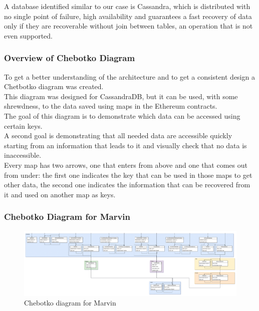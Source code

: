 \documentclass[ManualeSviluppatore.tex]{subfiles}
\begin{document}
A database identified similar to our case is Cassandra, which is distributed with no single point of failure, high availability and guarantees a fast recovery of data only if they are recoverable without join between tables, an operation that is not even supported.\\

\subsubsection{Overview of Chebotko Diagram}
To get a better understanding of the architecture and to get a consistent design a Chetbotko diagram was created.\\
This diagram was designed for CassandraDB, but it can be used, with some shrewdness, to the data saved using maps in the Ethereum contracts.\\
The goal of this diagram is to demonstrate which data can be accessed using certain keys.\\
A second goal is demonstrating that all needed data are accessible quickly starting from an information that leads to it and visually check that no data is inaccessible.\\
Every map has two arrows, one that enters from above and one that comes out from under: the first one indicates the key that can be used in those maps to get other data, the second one indicates the information that can be recovered from it and used on another map as keys.\\

\begin{landscape}
\newpage
\subsubsection{Chebotko Diagram for Marvin}
\begin{figure}[h]
	\centering
	\includegraphics[width=1\linewidth]{"diagrammi/Chebotko Diagram"}
	\caption{Chebotko diagram for Marvin}
	\label{fig:Chebotko diagram for Marvin}
\end{figure}
\end{landscape}
\newpage
\end{document}
